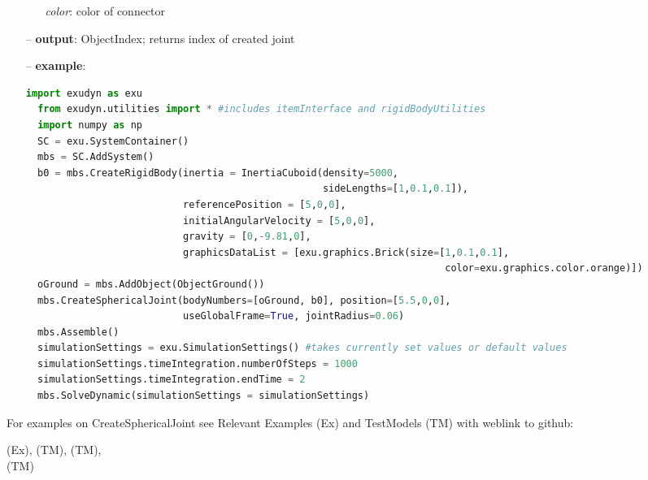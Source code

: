 \begin{itemize}[leftmargin=0.7cm]
\begin{itemize}[leftmargin=1.2cm]
\item[]{\it color}: color of connector
\end{itemize}
\item[--]
{\bf output}: ObjectIndex; returns index of created joint
\item[--]
{\bf example}: \vspace{-12pt}\ei\begin{lstlisting}[language=Python, xleftmargin=36pt]
  import exudyn as exu
  from exudyn.utilities import * #includes itemInterface and rigidBodyUtilities
  import numpy as np
  SC = exu.SystemContainer()
  mbs = SC.AddSystem()
  b0 = mbs.CreateRigidBody(inertia = InertiaCuboid(density=5000,
                                                   sideLengths=[1,0.1,0.1]),
                           referencePosition = [5,0,0],
                           initialAngularVelocity = [5,0,0],
                           gravity = [0,-9.81,0],
                           graphicsDataList = [exu.graphics.Brick(size=[1,0.1,0.1],
                                                                        color=exu.graphics.color.orange)])
  oGround = mbs.AddObject(ObjectGround())
  mbs.CreateSphericalJoint(bodyNumbers=[oGround, b0], position=[5.5,0,0],
                           useGlobalFrame=True, jointRadius=0.06)
  mbs.Assemble()
  simulationSettings = exu.SimulationSettings() #takes currently set values or default values
  simulationSettings.timeIntegration.numberOfSteps = 1000
  simulationSettings.timeIntegration.endTime = 2
  mbs.SolveDynamic(simulationSettings = simulationSettings)
\end{lstlisting}\vspace{-24pt}\bi\item[]\vspace{-24pt}\vspace{12pt}\end{itemize}
%

%
\noindent For examples on CreateSphericalJoint see Relevant Examples (Ex) and TestModels (TM) with weblink to github:
\bi
 \item \footnotesize {} (Ex), 
 (TM), 
 (TM), 
\\  (TM)
\ei

